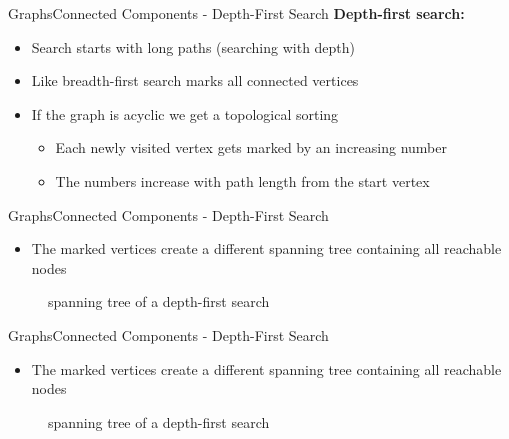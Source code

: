 
\begin{frame}{Graphs}{Connected Components - Depth-First Search}
  \textbf{Depth-first search:}
  \begin{itemize}
    \item<2->
      Search starts with {\color{MainA}long paths} (searching with depth)
    \item<3->
      Like {\color{MainA}breadth-first search} marks all connected
      vertices
    \item<4->
      If the graph is acyclic we get a {\color{MainA}topological sorting}
      \begin{itemize}
        \item<5->
          Each newly visited vertex gets marked by an increasing number
        \item<6->
          The numbers increase with path length from the start vertex
      \end{itemize}
  \end{itemize}
\end{frame}


\begin{frame}{Graphs}{Connected Components - Depth-First Search}
  \begin{itemize}
    \item
      The marked vertices create a different spanning tree containing all
      reachable nodes
  \end{itemize}
  \begin{figure}
    \begin{adjustbox}{width=0.95\linewidth}
      
    \end{adjustbox}
    \caption{spanning tree of a depth-first search}
  \end{figure}
\end{frame}


\begin{frame}{Graphs}{Connected Components - Depth-First Search}
  \begin{itemize}
    \item
      The marked vertices create a different spanning tree containing all
      reachable nodes
  \end{itemize}
  \begin{figure}
    \begin{adjustbox}{width=0.95\linewidth}
      
    \end{adjustbox}
    \caption{spanning tree of a depth-first search}
  \end{figure}
\end{frame}

